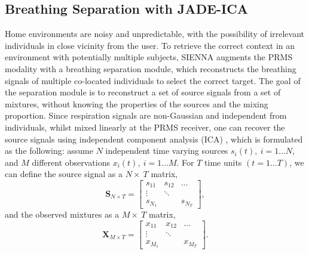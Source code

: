 \subsection{Breathing Separation with JADE-ICA}
\label{section:breathing separation}
Home environments are noisy and unpredictable, with the possibility of irrelevant individuals in close vicinity from the user. To retrieve the correct context in an environment with potentially multiple subjects, SIENNA augments the PRMS modality with a breathing separation module, which reconstructs the breathing signals of multiple co-located individuals to select the correct target. 
The goal of the separation module is to reconstruct a set of source signals from a set of mixtures, without knowing the properties of the sources and the mixing proportion. 
Since respiration signals are non-Gaussian and independent from individuals, whilst mixed linearly at the PRMS receiver, one can recover the source signals using independent component analysis (ICA) \cite{yue_extracting_2018}, which is formulated as the following: assume $N$ independent time varying sources $ s_i(t),\ i=1 \ldots N$, and $M$ different observations
$ x_i(t),\ i=1 \ldots M$. For $T$ time units $(t=1 \ldots T)$, we can define the source signal as a $N \times\ T$ matrix,
\[
\mathbf{S}_{N \times T} = \begin{bmatrix} 
    s_{11} & s_{12} & \dots \\
    \vdots & \ddots & \\
    s_{N_1} &        & s_{N_T} 
    \end{bmatrix},
\]
and the observed mixtures as a $M \times\ T$ matrix,
\[
\mathbf{X}_{M \times T} = \begin{bmatrix} 
    x_{11} & x_{12} & \dots \\
    \vdots & \ddots & \\
    x_{M_1} &        & x_{M_T}
    \end{bmatrix}.
\]
